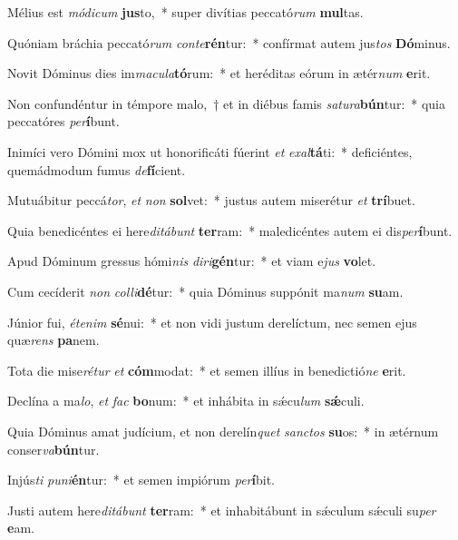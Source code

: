 \item Mélius est \textit{mó}\textit{di}\textit{cum} \textbf{jus}to,~* super divítias peccató\textit{rum} \textbf{mul}tas.
\item Quóniam bráchia peccató\textit{rum} \textit{con}\textit{te}\textbf{rén}tur:~* confírmat autem jus\textit{tos} \textbf{Dó}minus.
\item Novit Dóminus dies im\textit{ma}\textit{cu}\textit{la}\textbf{tó}rum:~* et heréditas eórum in ætér\textit{num} \textbf{e}rit.
\item Non confundéntur in témpore malo,~† et in diébus famis \textit{sa}\textit{tu}\textit{ra}\textbf{bún}tur:~* quia peccatóres \textit{per}\textbf{í}bunt.
\item Inimíci vero Dómini mox ut honorificáti fúerint \textit{et} \textit{ex}\textit{al}\textbf{tá}ti:~* deficiéntes, quemádmodum fumus \textit{de}\textbf{fí}cient.
\item Mutuábitur peccá\textit{tor}, \textit{et} \textit{non} \textbf{sol}vet:~* justus autem miserétur \textit{et} \textbf{trí}buet.
\item Quia benedicéntes ei here\textit{di}\textit{tá}\textit{bunt} \textbf{ter}ram:~* maledicéntes autem ei dis\textit{per}\textbf{í}bunt.
\item Apud Dóminum gressus hómi\textit{nis} \textit{di}\textit{ri}\textbf{gén}tur:~* et viam e\textit{jus} \textbf{vo}let.
\item Cum cecíderit \textit{non} \textit{col}\textit{li}\textbf{dé}tur:~* quia Dóminus suppónit ma\textit{num} \textbf{su}am.
\item Júnior fui, \textit{ét}\textit{e}\textit{nim} \textbf{sé}nui:~* et non vidi justum derelíctum, nec semen ejus quæ\textit{rens} \textbf{pa}nem.
\item Tota die mise\textit{ré}\textit{tur} \textit{et} \textbf{cóm}modat:~* et semen illíus in benedictió\textit{ne} \textbf{e}rit.
\item Declína a ma\textit{lo}, \textit{et} \textit{fac} \textbf{bo}num:~* et inhábita in sǽcu\textit{lum} \textbf{sǽ}culi.
\item Quia Dóminus amat judícium, et non derelín\textit{quet} \textit{sanc}\textit{tos} \textbf{su}os:~* in ætérnum conser\textit{va}\textbf{bún}tur.
\item Injús\textit{ti} \textit{pu}\textit{ni}\textbf{én}tur:~* et semen impiórum \textit{per}\textbf{í}bit.
\item Justi autem here\textit{di}\textit{tá}\textit{bunt} \textbf{ter}ram:~* et inhabitábunt in sǽculum sǽculi su\textit{per} \textbf{e}am.
